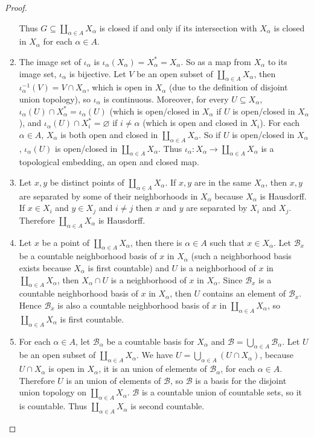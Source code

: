 \begin{proof}
\begin{enumerate}[label={(\alph*)}]
              Thus $G\subseteq \coprod_{\alpha\in A}X_{\alpha}$ is closed if and only if its intersection with $X_{\alpha}$ is closed in $X_{\alpha}$ for each $\alpha\in A$.
        \item The image set of $\iota_{\alpha}$ is $\iota_{\alpha}(X_{\alpha}) = X_{\alpha}^{*} = X_{\alpha}$. So as a map from $X_{\alpha}$ to its image set, $\iota_{\alpha}$ is bijective. Let $V$ be an open subset of $\coprod_{\alpha\in A}X_{\alpha}$, then $\iota_{\alpha}^{-1}(V) = V\cap X_{\alpha}$, which is open in $X_{\alpha}$ (due to the definition of disjoint union topology), so $\iota_{\alpha}$ is continuous. Moreover, for every $U\subseteq X_{\alpha}$, $\iota_{\alpha}(U)\cap X_{\alpha}^{*} = \iota_{\alpha}(U)$ (which is open/closed in $X_{\alpha}$ if $U$ is open/closed in $X_{\alpha}$), and $\iota_{\alpha}(U)\cap X^{*}_{i} = \varnothing$ if $i\ne \alpha$ (which is open and closed in $X_{i}$). For each $\alpha\in A$, $X_{\alpha}$ is both open and closed in $\coprod_{\alpha\in A}X_{\alpha}$. So if $U$ is open/closed in $X_{\alpha}$, $\iota_{\alpha}(U)$ is open/closed in $\coprod_{\alpha\in A}X_{\alpha}$. Thus $\iota_{\alpha}: X_{\alpha}\to \coprod_{\alpha\in A}X_{\alpha}$ is a topological embedding, an open and closed map.
        \item Let $x, y$ be distinct points of $\coprod_{\alpha\in A}X_{\alpha}$. If $x, y$ are in the same $X_{\alpha}$, then $x, y$ are separated by some of their neighborhoods in $X_{\alpha}$ because $X_{\alpha}$ is Hausdorff. If $x\in X_{i}$ and $y\in X_{j}$ and $i\ne j$ then $x$ and $y$ are separated by $X_{i}$ and $X_{j}$. Therefore $\coprod_{\alpha\in A}X_{\alpha}$ is Hausdorff.
        \item Let $x$ be a point of $\coprod_{\alpha\in A}X_{\alpha}$, then there is $\alpha\in A$ such that $x\in X_{\alpha}$. Let $\mathscr{B}_{x}$ be a countable neighborhood basis of $x$ in $X_{\alpha}$ (such a neighborhood basis exists because $X_{\alpha}$ is first countable) and $U$ is a neighborhood of $x$ in $\coprod_{\alpha\in A}X_{\alpha}$, then $X_{\alpha}\cap U$ is a neighborhood of $x$ in $X_{\alpha}$. Since $\mathscr{B}_{x}$ is a countable neighborhood basis of $x$ in $X_{\alpha}$, then $U$ contains an element of $\mathscr{B}_{x}$. Hence $\mathscr{B}_{x}$ is also a countable neighborhood basis of $x$ in $\coprod_{\alpha\in A}X_{\alpha}$, so $\coprod_{\alpha\in A}X_{\alpha}$ is first countable.
        \item For each $\alpha\in A$, let $\mathscr{B}_{\alpha}$ be a countable basis for $X_{\alpha}$ and $\mathscr{B} = \bigcup_{\alpha\in A}\mathscr{B}_{\alpha}$. Let $U$ be an open subset of $\coprod_{\alpha\in A}X_{\alpha}$. We have $U = \bigcup_{\alpha\in A}(U\cap X_{\alpha})$, because $U\cap X_{\alpha}$ is open in $X_{\alpha}$, it is an union of elements of $\mathscr{B}_{\alpha}$, for each $\alpha\in A$. Therefore $U$ is an union of elements of $\mathscr{B}$, so $\mathscr{B}$ is a basis for the disjoint union topology on $\coprod_{\alpha\in A}X_{\alpha}$. $\mathscr{B}$ is a countable union of countable sets, so it is countable. Thus $\coprod_{\alpha\in A}X_{\alpha}$ is second countable.
    \end{enumerate}
\end{proof}

